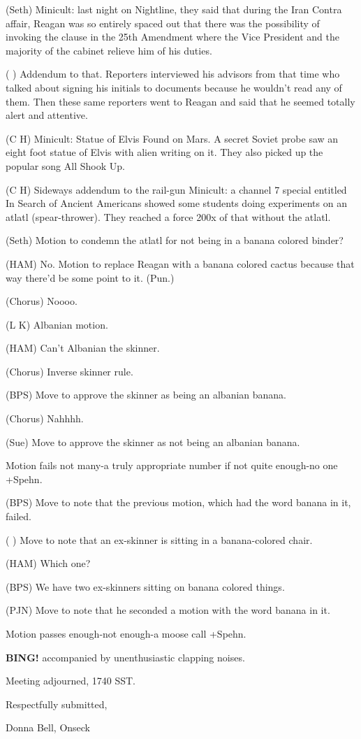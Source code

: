 \documentclass[12pt]{article}
\newcommand{\bing}{{\bf BING!} }
\begin{document}
(Seth) Minicult: last night on Nightline, they said that during the Iran Contra affair, Reagan was so entirely spaced out that there was the possibility of invoking the clause in the 25th Amendment where the Vice President and the majority of the cabinet relieve him of his duties.

( ) Addendum to that. Reporters interviewed his advisors from that time who talked about signing his initials to documents because he wouldn't read any of them. Then these same reporters went to Reagan and said that he seemed totally alert and attentive.

(C H) Minicult: Statue of Elvis Found on Mars. A secret Soviet probe saw an eight foot statue of Elvis with alien writing on it. They also picked up the popular song All Shook Up.

(C H) Sideways addendum to the rail-gun Minicult: a channel 7 special entitled In Search of Ancient Americans showed some students doing experiments on an atlatl (spear-thrower). They reached a force 200x of that without the atlatl.

(Seth) Motion to condemn the atlatl for not being in a banana colored binder?

(HAM) No. Motion to replace Reagan with a banana colored cactus because that way there'd be some point to it. (Pun.)

(Chorus) Noooo.

(L K) Albanian motion.

(HAM) Can't Albanian the skinner.

(Chorus) Inverse skinner rule.

(BPS) Move to approve the skinner as being an albanian banana.

(Chorus) Nahhhh.

(Sue) Move to approve the skinner as not being an albanian banana.

Motion fails not many-a truly appropriate number if not quite enough-no one +Spehn.

(BPS) Move to note that the previous motion, which had the word banana in it, failed.

( ) Move to note that an ex-skinner is sitting in a banana-colored chair.

(HAM) Which one?

(BPS) We have two ex-skinners sitting on banana colored things.

(PJN) Move to note that he seconded a motion with the word banana in it.

Motion passes enough-not enough-a moose call +Spehn.

\bing accompanied by unenthusiastic clapping noises.

\vspace{12pt}

\noindent
Meeting adjourned, 1740 SST.

\vspace{18pt}

\centerline{Respectfully submitted,}
\centerline{Donna Bell, Onseck}
\end{document}
